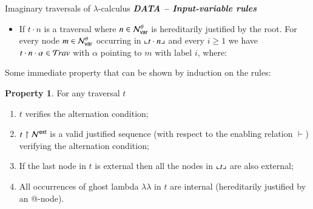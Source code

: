 \documentclass{elsarticle}
\theoremstyle{plain}
\theoremstyle{definition}
\newtheorem{property}{Property}[section]
\theoremstyle{remark}
\newcommand\Nodes{\mathcal{N}}%
\newcommand\NodesVar{\Nodes_{\sf var}}%
\newcommand{\ghostlmd}{{\lambda\!\!\lambda}}
\newcommand{\ghostvar}{\theta}
\newcommand\ImNodesVar{\NodesVar^\ghostvar}
\newcommand{\travulc}{\travset}
\newcommand{\enables}{\vdash} %
\newcommand{\ExtNodes}{\Nodes^{\sf ext}}
\begin{document}
\begin{table}
\begin{ruletablebox}{Imaginary traversals of $\lambda$-calculus}
\emph{\bf DATA -- Input-variable rules}
\begin{itemize}[leftmargin=3em]
\item[\rulenamet{IVar}] If $t \cdot n$ is a traversal where $n \in \ImNodesVar$ is hereditarily justified by the root. For every node $m \in \ImNodesVar$ occurring in $\llcorner t\cdot n \lrcorner$
and every $i\geq1$ we have $t \cdot n \cdot\alpha\in\travulc$ with $\alpha$ pointing to $m$ with label $i$, where:
\end{itemize}


\caption{Imaginary traversals $\travulc$ of the untyped lambda calculus.}
 \label{tab:trav_rules}
\end{ruletablebox}
\end{table}

Some immediate property that can be shown by induction on the rules:
\begin{property}
    \label{prop:trav_immediate}
   For any traversal $t$
   \begin{enumerate}[nosep]
   \item $t$ verifies the alternation condition;
   \item $t\filter\ExtNodes$ is a valid justified sequence (with respect to the enabling relation $\enables$) verifying the alternation condition;
   \item If the last node in $t$ is external then all the nodes in $\llcorner t \lrcorner$ are also external;
   \item All occurrences of ghost lambda $\ghostlmd$ in $t$ are internal (hereditarily justified by an @-node).
   \end{enumerate}
\end{property}
\end{document}
